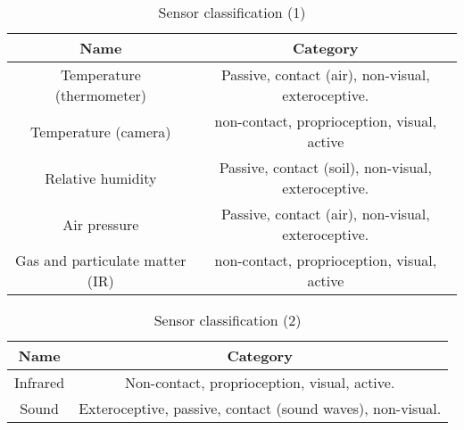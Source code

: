 \documentclass[a4paper, 12pt]{article}
\begin{document}
\begin{exercise}

		\begin{table*}[htpb]
    \centering
	\caption{Sensor classification (1)}
    \label{tab:label}
    \begin{tabular}{|c | c|}
		\hline
		Name & Category\\
		\hline
		Temperature (thermometer) & Passive, contact (air), non-visual,
		exteroceptive.\\
		\hline
		Temperature (camera) & non-contact, proprioception, visual, active\\
		\hline
		Relative humidity & Passive, contact (soil), non-visual, exteroceptive.\\
		\hline
		Air pressure & Passive, contact (air), non-visual, exteroceptive.\\
		\hline
		Gas and particulate matter (IR) & non-contact, proprioception, visual, active\\
		\hline
    \end{tabular}
\end{table*}
\begin{table*}[htpb]
    \centering
	\caption{Sensor classification (2)}
    \label{tab:label}
    \begin{tabular}{|c | c|}
		\hline
		Name & Category\\
		\hline
		Infrared & Non-contact, proprioception, visual, active.\\
		\hline
		Sound & Exteroceptive, passive, contact (sound waves), non-visual.\\
		\hline
    \end{tabular}
\end{table*}


\end{exercise}
\end{document}
